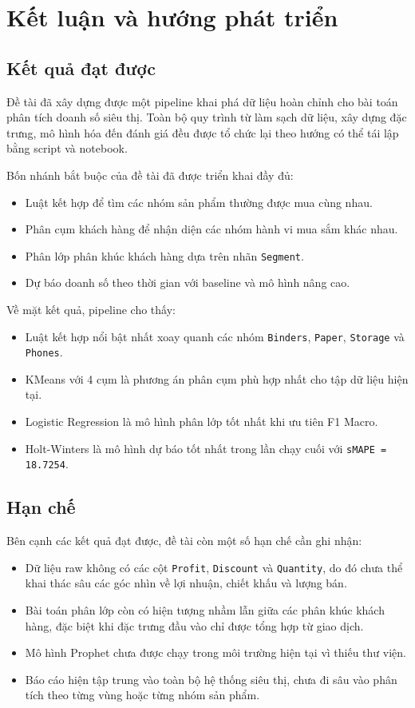 \chapter{Kết luận và hướng phát triển }\label{chapter_conclusion}

\section{Kết quả đạt được}

Đề tài đã xây dựng được một pipeline khai phá dữ liệu hoàn chỉnh cho bài toán phân tích doanh số siêu thị. Toàn bộ quy trình từ làm sạch dữ liệu, xây dựng đặc trưng, mô hình hóa đến đánh giá đều được tổ chức lại theo hướng có thể tái lập bằng script và notebook.

Bốn nhánh bắt buộc của đề tài đã được triển khai đầy đủ:
\begin{itemize}
\item Luật kết hợp để tìm các nhóm sản phẩm thường được mua cùng nhau.
\item Phân cụm khách hàng để nhận diện các nhóm hành vi mua sắm khác nhau.
\item Phân lớp phân khúc khách hàng dựa trên nhãn \texttt{Segment}.
\item Dự báo doanh số theo thời gian với baseline và mô hình nâng cao.
\end{itemize}

Về mặt kết quả, pipeline cho thấy:
\begin{itemize}
\item Luật kết hợp nổi bật nhất xoay quanh các nhóm \texttt{Binders}, \texttt{Paper}, \texttt{Storage} và \texttt{Phones}.
\item KMeans với 4 cụm là phương án phân cụm phù hợp nhất cho tập dữ liệu hiện tại.
\item Logistic Regression là mô hình phân lớp tốt nhất khi ưu tiên F1 Macro.
\item Holt-Winters là mô hình dự báo tốt nhất trong lần chạy cuối với \texttt{sMAPE = 18.7254}.
\end{itemize}

\section{Hạn chế}

Bên cạnh các kết quả đạt được, đề tài còn một số hạn chế cần ghi nhận:
\begin{itemize}
\item Dữ liệu raw không có các cột \texttt{Profit}, \texttt{Discount} và \texttt{Quantity}, do đó chưa thể khai thác sâu các góc nhìn về lợi nhuận, chiết khấu và lượng bán.
\item Bài toán phân lớp còn có hiện tượng nhầm lẫn giữa các phân khúc khách hàng, đặc biệt khi đặc trưng đầu vào chỉ được tổng hợp từ giao dịch.
\item Mô hình Prophet chưa được chạy trong môi trường hiện tại vì thiếu thư viện.
\item Báo cáo hiện tập trung vào toàn bộ hệ thống siêu thị, chưa đi sâu vào phân tích theo từng vùng hoặc từng nhóm sản phẩm.
\end{itemize}

